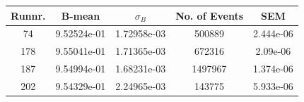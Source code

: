 \documentclass[12pt, letterpaper]{article}
\begin{document}
\begin{tabular}{|c|c|c|c|c|}
\hline
Runnr. & B-mean & $\sigma_{B}$ & No. of Events & SEM\\
\hline
74		&	9.52524e-01 	&	1.72958e-03	&  500889 &	2.444e-06 \\
178		&	9.55041e-01		&	1.71365e-03	&  672316 & 2.09e-06 \\
187 	&	9.54994e-01		&	1.68231e-03	&  1497967  & 1.374e-06 \\
202		&	9.54329e-01		&	2.24965e-03	&  143775 	& 5.933e-06 \\


\hline

\end{tabular}
\end{document}

